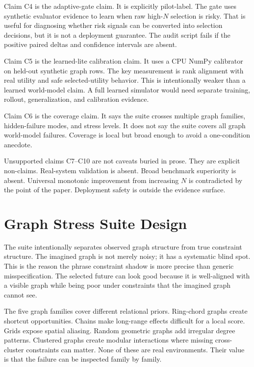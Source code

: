 \documentclass{article}
\begin{document}
Claim C4 is the adaptive-gate claim.  It is explicitly pilot-label.  The gate
uses synthetic evaluator evidence to learn when raw high-\(N\) selection is
risky.  That is useful for diagnosing whether risk signals can be converted into
selection decisions, but it is not a deployment guarantee.  The audit script
fails if the positive paired deltas and confidence intervals are absent.

Claim C5 is the learned-lite calibration claim.  It uses a CPU NumPy calibrator
on held-out synthetic graph rows.  The key measurement is rank alignment with
real utility and safe selected-utility behavior.  This is intentionally weaker
than a learned world-model claim.  A full learned simulator would need separate
training, rollout, generalization, and calibration evidence.

Claim C6 is the coverage claim.  It says the suite crosses multiple graph
families, hidden-failure modes, and stress levels.  It does not say the suite
covers all graph world-model failures.  Coverage is local but broad enough to
avoid a one-condition anecdote.

Unsupported claims C7--C10 are not caveats buried in prose.  They are explicit
non-claims.  Real-system validation is absent.  Broad benchmark superiority is
absent.  Universal monotonic improvement from increasing \(N\) is contradicted
by the point of the paper.  Deployment safety is outside the evidence surface.

\section{Graph Stress Suite Design}

The suite intentionally separates observed graph structure from true constraint
structure.  The imagined graph is not merely noisy; it has a systematic blind
spot.  This is the reason the phrase constraint shadow is more precise than
generic misspecification.  The selected future can look good because it is
well-aligned with a visible graph while being poor under constraints that the
imagined graph cannot see.

The five graph families cover different relational priors.  Ring-chord graphs
create shortcut opportunities.  Chains make long-range effects difficult for a
local score.  Grids expose spatial aliasing.  Random geometric graphs add
irregular degree patterns.  Clustered graphs create modular interactions where
missing cross-cluster constraints can matter.  None of these are real
environments.  Their value is that the failure can be inspected family by
family.
\end{document}
